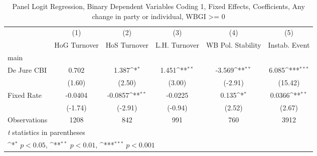 \begin{table}[htbp]\centering
\def\sym#1{\ifmmode^{#1}\else\(^{#1}\)\fi}
\caption{Panel Logit Regression, Binary Dependent Variables Coding 1, Fixed Effects, Coefficients, Any change in party or individual, WBGI >= 0 \label{logitFEMultIndDJ}}
\begin{tabular}{l*{5}{c}}
\toprule
                                        &\multicolumn{1}{c}{(1)}&\multicolumn{1}{c}{(2)}&\multicolumn{1}{c}{(3)}&\multicolumn{1}{c}{(4)}&\multicolumn{1}{c}{(5)}\\
                                        &\multicolumn{1}{c}{HoG Turnover}&\multicolumn{1}{c}{HoS Turnover}&\multicolumn{1}{c}{L.H. Turnover}&\multicolumn{1}{c}{WB Pol. Stability}&\multicolumn{1}{c}{Instab. Event}\\
\midrule
main                                    &                  &                  &                  &                  &                  \\
De Jure CBI                             &    0.702         &    1.387\sym{*}  &    1.451\sym{**} &   -3.569\sym{**} &    6.085\sym{***}\\
                                        &   (1.60)         &   (2.50)         &   (3.00)         &  (-2.91)         &  (15.42)         \\
\addlinespace
Fixed Rate                              &  -0.0404         &  -0.0857\sym{**} &  -0.0225         &    0.135\sym{*}  &   0.0366\sym{**} \\
                                        &  (-1.74)         &  (-2.91)         &  (-0.94)         &   (2.52)         &   (2.67)         \\
\midrule
Observations                            &     1208         &      842         &      991         &      760         &     3912         \\
\bottomrule
\multicolumn{6}{l}{\footnotesize \textit{t} statistics in parentheses}\\
\multicolumn{6}{l}{\footnotesize \sym{*} \(p<0.05\), \sym{**} \(p<0.01\), \sym{***} \(p<0.001\)}\\
\end{tabular}
\end{table}
